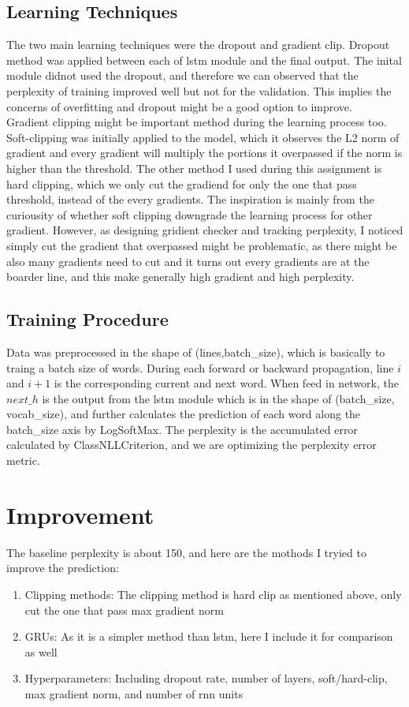 \documentclass{article}
\begin{document}
\subsection{Learning Techniques}
The two main learning techniques were the dropout and gradient clip. Dropout method was applied between each of lstm module and the final output. The inital module didnot used the dropout, and therefore we can observed that the perplexity of training improved well but not for the validation. This implies the concerns of overfitting and dropout might be a good option to improve.\\
Gradient clipping might be important method during the learning process too. Soft-clipping was initially applied to the model, which it observes the L2 norm of gradient and every gradient will multiply the portions it overpassed if the norm is higher than the threshold. The other method I used during this assignment is hard clipping, which we only cut the gradiend for only the one that pass threshold, instead of the every gradients. The inspiration is mainly from the curiousity of whether soft clipping downgrade the learning process for other gradient. However, as designing gridient checker and tracking perplexity, I noticed simply cut the gradient that overpassed might be problematic, as there might be also many gradients need to cut and it turns out every gradients are at the boarder line, and this make generally high gradient and high perplexity.

\subsection{Training Procedure}
Data was preprocessed in the shape of (lines,batch\_size), which is basically to traing a batch size of words. During each forward or backward propagation, line $i$ and $i+1$ is the corresponding current and next word. When feed in network, the $next\_h$ is the output from the lstm module which is in the shape of (batch\_size, vocab\_size), and further calculates the prediction of each word along the batch\_size axis by LogSoftMax. The perplexity is the accumulated error calculated by ClassNLLCriterion, and we are optimizing the perplexity error metric.

\section{Improvement}
The baseline perplexity is about 150, and here are the mothods I tryied to improve the prediction:
\begin{enumerate}
   \item Clipping methods: The clipping method is hard clip as mentioned above, only cut the one that pass max gradient norm
   \item GRUs: As it is a simpler method than lstm, here I include it for comparison as well
   \item Hyperparameters: Including dropout rate, number of layers, soft/hard-clip, max gradient norm, and number of rnn units
\end{enumerate}
\end{document}

